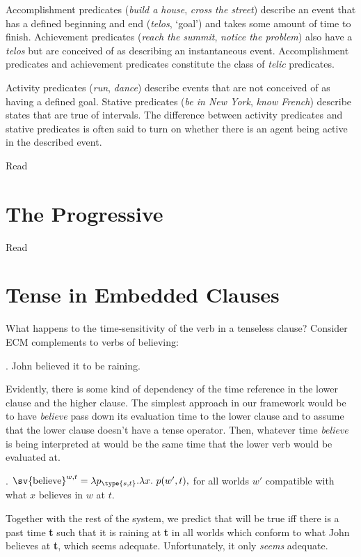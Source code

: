 Accomplishment predicates (\emph{build a house}, \emph{cross the street}) describe an event that has a defined beginning and end (\emph{telos}, `goal') and takes some amount of time to finish. Achievement predicates (\emph{reach the summit}, \emph{notice the problem}) also have a \emph{telos} but are conceived of as describing an instantaneous event. Accomplishment predicates and achievement predicates constitute the class of \emph{telic} predicates.

Activity predicates (\emph{run}, \emph{dance}) describe events that are not conceived of as having a defined goal. Stative predicates (\emph{be in New York}, \emph{know French}) describe states that are true of intervals. The difference between activity predicates and stative predicates is often said to turn on whether there is an agent being active in the described event.

\bigskip\noindent\dash Read \citealt[Chapter 1, pp. 1--35]{rothstein:2004:events} \dash

\section{The Progressive}

\noindent\dash Read \citealt{portner:1998:progressive} \dash

\section{Tense in Embedded Clauses}

What happens to the time-sensitivity of the verb in a tenseless clause? Consider ECM complements to verbs of believing:

\ex.\label{ex:rain} John believed it to be raining.

Evidently, there is some kind of dependency of the time reference in the lower clause and the higher clause. The simplest approach in our framework would be to have \emph{believe} pass down its evaluation time to the lower clause and to assume that the lower clause doesn't have a tense operator. Then, whatever time \emph{believe} is being interpreted at would be the same time that the lower verb would be evaluated at.

\ex.\label{ex:believe-pass} $\sv{\text{believe}}^{w,t} = \lambda p_{\type{s,t}}. \lambda x.\ p(w',t),$ for all worlds $w'$ compatible with what $x$ believes in $w$ at $t$.

Together with the rest of the system, we predict that \LLast will be true iff there is a past time \textbf{t} such that it is raining at \textbf{t} in all worlds which conform to what John believes at \textbf{t}, which seems adequate. Unfortunately, it only \emph{seems} adequate.

